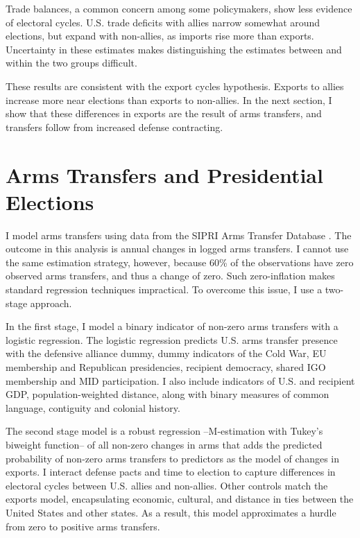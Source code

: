 \documentclass[12pt]{article}
\begin{document}
Trade balances, a common concern among some policymakers, show less evidence of electoral cycles. 
U.S. trade deficits with allies narrow somewhat around elections, but expand with non-allies, as imports rise more than exports. 
Uncertainty in these estimates makes distinguishing the estimates between and within the two groups difficult.


These results are consistent with the export cycles hypothesis. 
Exports to allies increase more near elections than exports to non-allies.
In the next section, I show that these differences in exports are the result of arms transfers, and transfers follow from increased defense contracting.



\section{Arms Transfers and Presidential Elections}


I model arms transfers using data from the SIPRI Arms Transfer Database \citep{SIPRI2021}.
The outcome in this analysis is annual changes in logged arms transfers.
I cannot use the same estimation strategy, however, because 60\% of the observations have zero observed arms transfers, and thus a change of zero.
Such zero-inflation makes standard regression techniques impractical.
To overcome this issue, I use a two-stage approach. 


In the first stage, I model a binary indicator of non-zero arms transfers with a logistic regression. 
The logistic regression predicts U.S. arms transfer presence with the defensive alliance dummy, dummy indicators of the Cold War, EU membership and Republican presidencies, recipient democracy, shared IGO membership and MID participation. 
I also include indicators of U.S. and recipient GDP, population-weighted distance, along with binary measures of common language, contiguity and colonial history. 


The second stage model is a robust regression --M-estimation with Tukey's biweight function-- of all non-zero changes in arms that adds the predicted probability of non-zero arms transfers to predictors as the model of changes in exports.
I interact defense pacts and time to election to capture differences in electoral cycles between U.S. allies and non-allies. 
Other controls match the exports model, encapsulating economic, cultural, and distance in ties between the United States and other states.
As a result, this model approximates a hurdle from zero to positive arms transfers.
\end{document}
